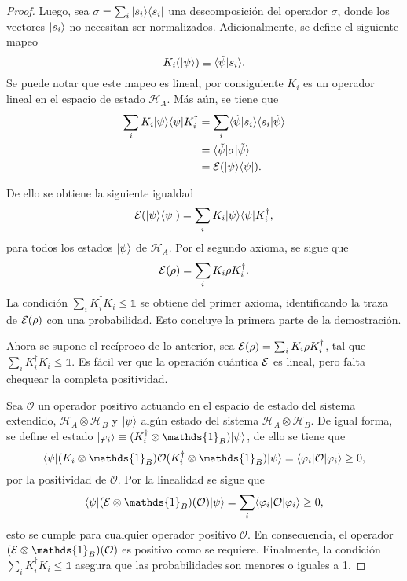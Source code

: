 \begin{proof}
Luego, sea $\sigma=\sum_i |s_i\rangle \langle s_i|$ una descomposición del operador $\sigma$, donde los vectores $|s_i\rangle$ no necesitan ser normalizados. Adicionalmente, se define el siguiente mapeo \begin{equation}K_i(|\psi\rangle) \equiv \langle\tilde{\psi}|s_i\rangle.\end{equation} 
Se puede notar que este mapeo es lineal, por consiguiente $K_i$ es un operador lineal en el espacio de estado $\mathcal{H}_A$. Más aún, se tiene que \begin{equation}
    \begin{split}
       \sum_i K_i |\psi \rangle \langle \psi |K_i^\dagger&=\sum_i  \langle\tilde{\psi}|s_i\rangle \langle s_i|\tilde{\psi}\rangle\\
        &=\langle \tilde \psi |\sigma |\tilde{\psi}\rangle\\
        &=\mathcal{E}(|\psi \rangle \langle\psi|).\\
    \end{split}
\end{equation}



De ello se obtiene la siguiente igualdad \[\mathcal{E}(|\psi\rangle \langle \psi|)=\sum_i K_i |\psi \rangle \langle \psi |K_i^\dagger,\] para todos los estados $|\psi\rangle$ de $\mathcal{H}_A$. Por el segundo axioma, se sigue que \[\mathcal{E}(\rho)=\sum_i K_i \rho K_i^\dagger.\] La condición $\sum_i K_i^\dagger K_i\le \mathds{1}$ se obtiene del primer axioma, identificando la traza de $\mathcal{E}(\rho) $ con una probabilidad. Esto concluye la primera parte de la demostración.

Ahora se supone el recíproco de lo anterior, sea $\mathcal{E}(\rho)=\sum_i K_i \rho K_i^\dagger$, tal que $\sum_i K_i^\dagger K_i \le \mathds{1}$. Es fácil ver que la operación cuántica $\mathcal{E}$ es lineal, pero falta chequear la completa positividad.

Sea $\mathcal{O}$ un operador positivo actuando en el espacio de estado del sistema extendido, $\mathcal{H}_A\otimes \mathcal{H}_B$ y $|\psi \rangle$ algún estado del sistema $\mathcal{H}_A\otimes \mathcal{H}_B$. De igual forma, se define el estado  $|\varphi_i\ra \equiv (K_i^\dagger \otimes \mathds{1}_B)|\psi\ra$, de ello se tiene que \[\la \psi |(K_i \otimes \mathds{1}_B)\mathcal{O}(K_i^\dagger \otimes \mathds{1}_B)|\psi\ra=\la \varphi_i |\mathcal{O}|\varphi_i\ra \ge 0,\] por la positividad de $\mathcal{O}$. Por la linealidad se sigue que \[\la \psi| (\E \otimes \mathds{1}_B)(\mathcal{O})|\psi\ra=\sum_i \la \varphi_i|\mathcal{O}|\varphi_i\ra \ge 0,\] esto se cumple para cualquier operador positivo $\mathcal{O}$. En consecuencia, el operador $(\E\otimes \mathds{1}_B)(\mathcal{O})$ es positivo como se requiere. Finalmente, la condición $\sum_i K_i^\dagger K_i \le \mathds{1}$ asegura que las probabilidades son menores o iguales a 1. 
\end{proof}

